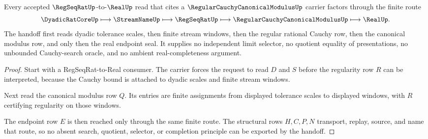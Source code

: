 \begin{theorem}
\label{thm:regular-cauchy-canonical-modulus-regseqrat-handoff}
Every accepted $\RegSeqRatUp$-to-$\RealUp$ read that cites a $\RegularCauchyCanonicalModulusUp$ carrier factors through the finite route
$$
\DyadicRatCoreUp \longmapsto \StreamNameUp \longmapsto \RegSeqRatUp \longmapsto \RegularCauchyCanonicalModulusUp \longmapsto \RealUp .
$$
The handoff first reads dyadic tolerance scales, then finite stream windows, then the regular rational Cauchy row, then the canonical modulus row, and only then the real endpoint seal. It supplies no independent limit selector, no quotient equality of presentations, no unbounded Cauchy-search oracle, and no ambient real-completeness argument.
\end{theorem}
\begin{proof}
Start with a RegSeqRat-to-Real consumer. The carrier forces the request to read $D$ and $S$ before the regularity row $R$ can be interpreted, because the Cauchy bound is attached to dyadic scales and finite stream windows.

Next read the canonical modulus row $Q$. Its entries are finite assignments from displayed tolerance scales to displayed windows, with $R$ certifying regularity on those windows.

The endpoint row $E$ is then reached only through the same finite route. The structural rows $H,C,P,N$ transport, replay, source, and name that route, so no absent search, quotient, selector, or completion principle can be exported by the handoff.
\end{proof}




